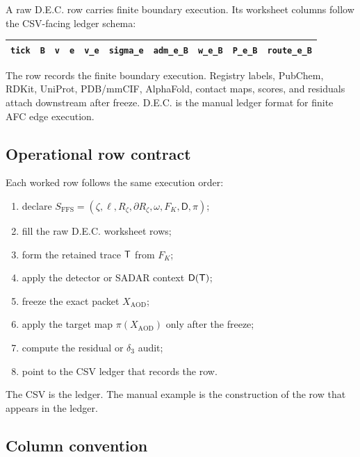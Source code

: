 A raw D.E.C. row carries finite boundary execution. Its worksheet columns follow the CSV-facing ledger schema:
\begin{center}
\small
\begin{tabularx}{0.98\linewidth}{@{}llllllllll@{}}
\toprule
\texttt{tick} & \texttt{B} & \texttt{v} & \texttt{e} & \texttt{v\_e} & \texttt{sigma\_e} & \texttt{adm\_e\_B} & \texttt{w\_e\_B} & \texttt{P\_e\_B} & \texttt{route\_e\_B} \\
\bottomrule
\end{tabularx}
\end{center}
The row records the finite boundary execution. Registry labels, PubChem, RDKit, UniProt, PDB/mmCIF, AlphaFold, contact maps, scores, and residuals attach downstream after freeze. D.E.C. is the manual ledger format for finite AFC edge execution.

\subsection{Operational row contract}

Each worked row follows the same execution order:
\begin{enumerate}[leftmargin=2.3em]
  \item declare $S_{\mathrm{FFS}}=(\zeta,\ell,R_{\zeta},\partial R_{\zeta},\omega,F_K,\mathsf D,\pi)$;
  \item fill the raw D.E.C. worksheet rows;
  \item form the retained trace $\mathsf T$ from $F_K$;
  \item apply the detector or SADAR context $\mathsf D(\mathsf T)$;
  \item freeze the exact packet $X_{\mathrm{AOD}}$;
  \item apply the target map $\pi(X_{\mathrm{AOD}})$ only after the freeze;
  \item compute the residual or $\delta_3$ audit;
  \item point to the CSV ledger that records the row.
\end{enumerate}

The CSV is the ledger. The manual example is the construction of the row that appears in the ledger.


\subsection{Column convention}

